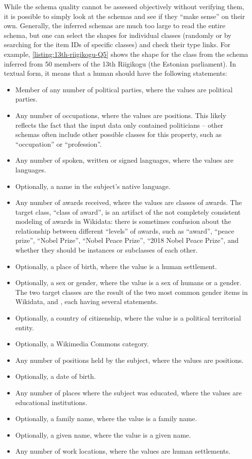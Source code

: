While the schema quality cannot be assessed objectively without verifying them,
it is possible to simply look at the schemas and see if they “make sense” on their own.
Generally, the inferred schemas are much too large to read the entire schema,
but one can select the shapes for individual classes
(randomly or by searching for the item IDs of specific classes)
and check their type links.
For example, \cref{listing:13th-riigikogu-Q5} shows the shape for the class 
from the schema inferred from 50 members of the 13th Riigikogu (the Estonian parliament).
In textual form, it means that a human should have the following statements:
\begin{itemize}
\item Member of any number of political parties, where the values are political parties.
\item Any number of occupations, where the values are positions.
  This likely reflects the fact that the input data only contained politicians –
  other schemas often include other possible classes for this property,
  such as “occupation” or “profession”.
\item Any number of spoken, written or signed languages, where the values are languages.
\item Optionally, a name in the subject’s native language.
\item Any number of awards received, where the values are classes of awards.
  The target class, “class of award”, is an artifact of the not completely consistent modeling of awards in Wikidata:
  there is sometimes confusion about the relationship between different “levels” of awards,
  such as “award”, “peace prize”, “Nobel Prize”, “Nobel Peace Prize”, “2018 Nobel Peace Prize”,
  and whether they should be instances or subclasses of each other.
\item Optionally, a place of birth, where the value is a human settlement.
\item Optionally, a sex or gender, where the value is a sex of humans or a gender.
  The two target classes are the result of the two most common gender items in Wikidata,
   and ,
  each having several  statements.
\item Optionally, a country of citizenship, where the value is a political territorial entity.
\item Optionally, a Wikimedia Commons category.
\item Any number of positions held by the subject, where the values are positions.
\item Optionally, a date of birth.
\item Any number of places where the subject was educated, where the values are educational institutions.
\item Optionally, a family name, where the value is a family name.
\item Optionally, a given name, where the value is a given name.
\item Any number of work locations, where the values are human settlements.
\end{itemize}

